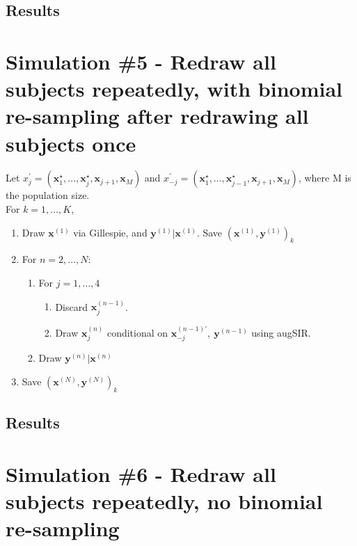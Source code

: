 \documentclass[11pt]{article}
\newcommand{\bx}{\mathbf{x}}
\newcommand{\by}{\mathbf{y}}
\begin{document}
\subsection*{Results}
\newpage
\section{Simulation \#5 - Redraw all subjects repeatedly, with binomial re-sampling after redrawing all subjects once}
Let $ x_j^\prime = (\bx_1^\star,\dots,\bx_{j}^\star,\bx_{j+1},\bx_{M})$ and $ x_{-j}^\prime = (\bx_1^\star,\dots,\bx_{j-1}^\star,\bx_{j+1},\bx_{M})$, where M is the population size.\\
For $ k = 1,\dots,K $,
\begin{enumerate}
	\item Draw $ \bx^{(1)} $ via Gillespie, and $ \by^{(1)}|\bx^{(1)} $. Save $ (\bx^{(1)}, \by^{(1)})_{k} $
	\item For $ n = 2,\dots,N $:
	\begin{enumerate}
		\item For $ j=1,\dots,4 $
		\begin{enumerate}
			\item Discard $ \bx_j^{(n-1)} $.
			\item Draw $ \bx_j^{(n)} $ conditional on $ \bx_{-j}^{(n-1) \prime},\ \by^{(n-1)} $ using augSIR.
		\end{enumerate}
		\item Draw $ \by^{(n)}|\bx^{(n)} $
	\end{enumerate} 
	\item Save $ (\bx^{(N)}, \by^{(N)})_{k} $
\end{enumerate}


\subsection*{Results}


\newpage
\section*{Simulation \#6 - Redraw all subjects repeatedly, no binomial re-sampling}
\end{document}
